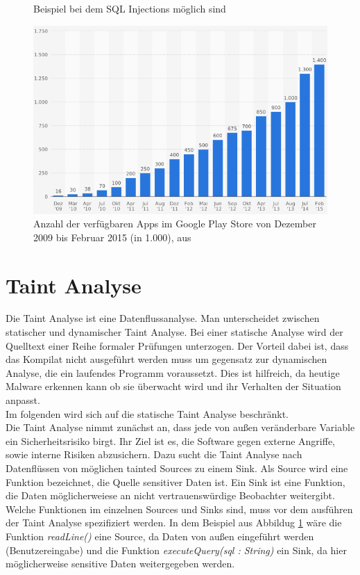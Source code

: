 \documentclass[runningheads]{llncs}
\begin{document}
\begin{figure}

\caption{Beispiel bei dem SQL Injections möglich sind}
\label{fig:sql_code}
\end{figure}

\begin{figure}[htp]
\centering
\includegraphics[scale=0.60]{img/playstore.png}
\caption{Anzahl der verfügbaren Apps im Google Play Store von Dezember 2009 bis Februar 2015 (in 1.000), aus \cite{playstore}}
\label{fig:playstore}
\end{figure} 

\section{Taint Analyse}\label{sec:taintAnalyse}
Die Taint Analyse ist eine Datenflussanalyse. Man unterscheidet zwischen statischer und dynamischer Taint Analyse. Bei einer statische Analyse wird der Quelltext einer Reihe formaler Prüfungen unterzogen. Der Vorteil dabei ist, dass das Kompilat nicht ausgeführt werden muss um gegensatz zur dynamischen Analyse, die ein laufendes Programm voraussetzt. Dies ist hilfreich, da heutige Malware erkennen kann ob sie überwacht wird und ihr Verhalten der Situation anpasst. \\
Im folgenden wird sich auf die statische Taint Analyse beschränkt.\\
Die Taint Analyse nimmt zunächst an, dass jede von außen veränderbare Variable ein Sicherheitsrisiko birgt. Ihr Ziel ist es, die Software gegen externe Angriffe, sowie interne Risiken abzusichern. Dazu sucht die Taint Analyse nach Datenflüssen von möglichen tainted Sources zu einem Sink. Als Source wird eine Funktion bezeichnet, die Quelle sensitiver Daten ist. Ein Sink ist eine Funktion, die Daten möglicherweiese an nicht vertrauenswürdige Beobachter weitergibt. Welche Funktionen im einzelnen Sources und Sinks sind, muss vor dem ausführen der Taint Analyse spezifiziert werden. In dem Beispiel aus Abbildug \ref{fig:sql_code} wäre die Funktion \emph{readLine()} eine Source, da Daten von außen eingeführt werden (Benutzereingabe) und die Funktion \emph{executeQuery(sql : String)} ein Sink, da hier möglicherweise sensitive Daten weitergegeben werden.
\end{document}
